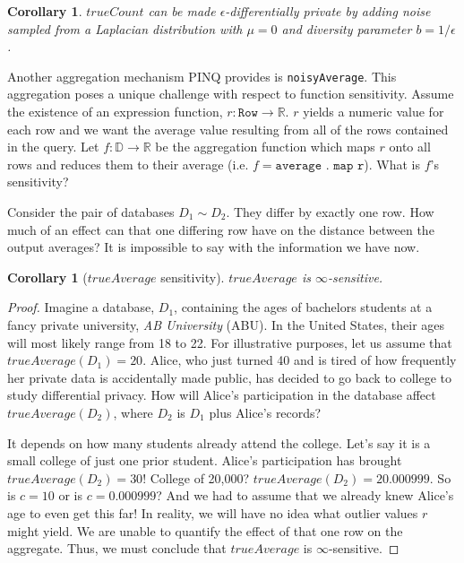 \documentclass[12pt]{report}
\newtheorem{cor}[defn]{Corollary}
\begin{document}
\begin{cor}
$trueCount$ can be made $\epsilon$-differentially private by adding noise sampled from a Laplacian distribution with $\mu = 0$ and diversity parameter $b=1/\epsilon$.
\end{cor}

Another aggregation mechanism PINQ provides is \texttt{noisyAverage}.
This aggregation poses a unique challenge with respect to function sensitivity.
Assume the existence of an expression function, $r : \texttt{Row} \rightarrow \mathbb R$.
$r$ yields a numeric value for each row and we want the average value resulting from all of the rows contained in the query.
Let $f : \mathbb D \rightarrow \mathbb R$ be the aggregation function which maps $r$ onto all rows and reduces them to their average (i.e. $f = \texttt{average . map r}$).
What is $f$'s sensitivity?

Consider the pair of databases $D_1 \sim D_2$.
They differ by exactly one row.
How much of an effect can that one differing row have on the distance between the output averages?
It is impossible to say with the information we have now.

\begin{cor}[$trueAverage$ sensitivity]
  $trueAverage$ is $\infty$-sensitive.
\end{cor}
\begin{proof}
Imagine a database, $D_1$, containing the ages of bachelors students at a fancy private university, \textit{AB University} (ABU).
In the United States, their ages will most likely range from 18 to 22.
For illustrative purposes, let us assume that $trueAverage(D_1) = 20$.
Alice, who just turned 40 and is tired of how frequently her private data is accidentally made public, has decided to go back to college to study differential privacy.
How will Alice's participation in the database affect $trueAverage(D_2)$, where $D_2$ is $D_1$ plus Alice's records?

It depends on how many students already attend the college.
Let's say it is a small college of just one prior student.
Alice's participation has brought $trueAverage(D_2) = 30$!
College of 20,000?
$trueAverage(D_2) = 20.000999$.
So is $c=10$ or is $c=0.000999$?
And we had to assume that we already knew Alice's age to even get this far!
In reality, we will have no idea what outlier values $r$ might yield.
We are unable to quantify the effect of that one row on the aggregate.
Thus, we must conclude that $trueAverage$ is $\infty$-sensitive.
\end{proof}
\end{document}
